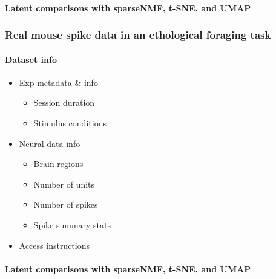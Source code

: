 \paragraph{Latent comparisons with sparseNMF, t-SNE, and UMAP}

\subsubsection{Real mouse spike data in an ethological foraging task}
\label{subsubsection:aeon_results_additional}

\paragraph{Dataset info}
\begin{itemize}

    \item Exp metadata \& info
    
    \begin{itemize}
        \item Session duration
        \item Stimulus conditions
    \end{itemize}
    
    \item Neural data info
    
    \begin{itemize}
        \item Brain regions
        \item Number of units
        \item Number of spikes
        \item Spike summary stats
    \end{itemize}

    \item Access instructions

\end{itemize}

\paragraph{Latent comparisons with sparseNMF, t-SNE, and UMAP}

